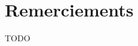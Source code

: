 \documentclass[french]{spimufcphdthesis}
\begin{document}
\chapter*{Remerciements}

TODO


\tableofcontents
\mainmatter























\backmatter




\listoffigures
\listofdefinitions
\listofmypropertys


\end{document}

